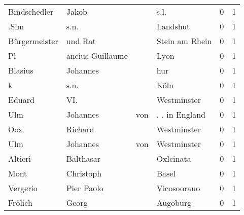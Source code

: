 \begin{tabular}{llllrr}
             Bindschedler &                              Jakob &             &                                        s.l. &          0 &         1 \\
                     .Sim &                               s.n. &             &                                    Landshut &          0 &         1 \\
            Bürgermeister &                            und Rat &             &                              Stein am Rhein &          0 &         1 \\
                       Pl &                   ancius Guillaume &             &                                        Lyon &          0 &         1 \\
                  Blasius &                           Johannes &             &                                         hur &          0 &         1 \\
                        k &                               s.n. &             &                                        Köln &          0 &         1 \\
                   Eduard &                                VI. &             &                                 Westminster &          0 &         1 \\
                      Ulm &                           Johannes &         von &                              . . in England &          0 &         1 \\
                      Oox &                            Richard &             &                                 Westminster &          0 &         1 \\
                      Ulm &                           Johannes &         von &                                 Westminster &          0 &         1 \\
                  Altieri &                          Balthasar &             &                                   Oxlcinata &          0 &         1 \\
                     Mont &                          Christoph &             &                                       Basel &          0 &         1 \\
                 Vergerio &                         Pier Paolo &             &                                 Vicosoorauo &          0 &         1 \\
                  Frölich &                              Georg &             &                                    Augoburg &          0 &         1 \\

\end{tabular}
